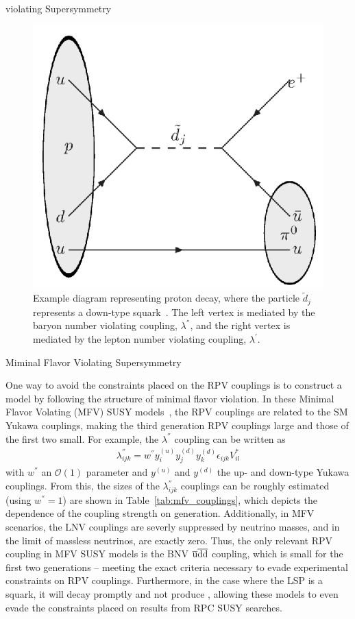 \begin{section}{\RP violating Supersymmetry}
\begin{figure}[tbp!]
\begin{center}
\includegraphics[angle=0,width=0.40\columnwidth]{fig/proton_decay.png}
\end{center}
\caption{Example diagram representing proton decay, where the particle $\tilde{d}_j$ represents a down-type squark~\cite{Allanach:2016yth}.
The left vertex is mediated by the baryon number violating coupling, $\lambda^{''}$, and the right vertex is mediated by the lepton number violating coupling, $\lambda^{'}$.}
\label{fig:proton_decay}
\end{figure}

\begin{subsection}{Miminal Flavor Violating Supersymmetry}

One way to avoid the constraints placed on the RPV couplings is to construct a model by following the structure of minimal flavor violation.
In these Minimal Flavor Volating (MFV) SUSY models~\cite{Csaki:2013we,Krnjaic:2012aj,Csaki:2011ge}, the RPV couplings are related to the SM Yukawa couplings, making the third generation RPV couplings large and those of the first two small.
For example, the $\lambda^{''}$ coupling can be written as
\begin{align}
\lambda^{''}_{ijk} = w^{''} y^{(u)}_i y^{(d)}_j y^{(d)}_k \epsilon_{ijk} V^{*}_{il}
\end{align}
with $w^{''}$ an $\mathcal{O}(1)$ parameter and $y^{(u)}$ and $y^{(d)}$ the up- and down-type Yukawa couplings.
From this, the sizes of the $\lambda^{''}_{ijk}$ couplings can be roughly estimated (using $w^{''} = 1$) are shown in Table~\ref{tab:mfv_couplings}, which depicts the dependence of the coupling strength on generation.
Additionally, in MFV scenarios, the LNV couplings are severly suppressed by neutrino masses, and in the limit of massless neutrinos, are exactly zero.
Thus, the only relevant RPV coupling in MFV SUSY models is the BNV $\overline{\mathrm{u}}\overline{\mathrm{d}}\overline{\mathrm{d}}$ coupling, which is small for the first two generations -- meeting the exact criteria necessary to evade experimental constraints on RPV couplings.
Furthermore, in the case where the LSP is a squark, it will decay promptly and not produce \MET, allowing these models to even evade the constraints placed on results from RPC SUSY searches.


\end{subsection}
\end{section}
